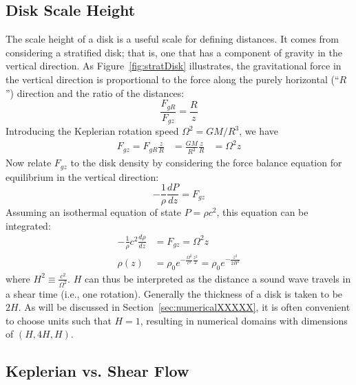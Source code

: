 \subsection{Disk Scale Height}
The scale height of a disk is a useful scale for defining distances. It comes from considering a stratified disk; that is, one that has a component of gravity in the vertical direction. As Figure~\ref{fig:stratDisk} illustrates, the gravitational force in the vertical direction is proportional to the force along the purely horizontal (``$R$'') direction and the ratio of the distances:
\begin{equation}
\frac{F_{gR}}{F_{gz}}=\frac{R}{z}
\end{equation}
Introducing the Keplerian rotation speed $\Omega^2=GM/R^3$, we have  
\begin{align*}
F_{gz}=F_{gR}\frac z R&=\frac{GM}{R^2}\frac zR
&=\Omega^2 z
\end{align*}
Now relate $F_{gz}$ to the disk density by considering the force balance equation for equilibrium in the vertical direction:
\begin{equation*}
-\frac1\rho\frac{dP}{dz}=F_{gz}
\end{equation*}
Assuming an isothermal equation of state $P=\rho c^2$, this equation can be integrated:
\begin{align*}
-\frac1\rho c^2\frac{d\rho}{dz}&=F_{gz}=\Omega^2z\\
\rho(z)&=\rho_0 e^{-\frac{\Omega^2}{c^2}\frac{z^2}2}=\rho_0e^{-\frac{z^2}{2H^2}}
\end{align*}
where $H^2\equiv\frac{c^2}{\Omega^2}$. $H$ can thus be interpreted as the distance a sound wave travels in a shear time (i.e., one rotation). Generally the thickness of a disk is taken to be $2H$. As will be discussed in Section~\ref{sec:numericalXXXXX}, it is often convenient to choose units such that $H=1$, resulting in numerical domains with dimensions of $(H,4H,H)$. 



\subsection{Keplerian vs. Shear Flow}
